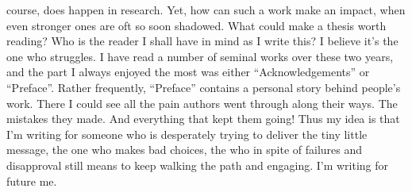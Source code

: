 course, does happen in research. Yet, how can such a work make an impact, when
even stronger ones are oft so soon shadowed.
What could make a thesis worth reading? Who is the reader I shall have in mind
as I write this? I believe it's the one who struggles. I have read a number of
seminal works over these two years, and the part I always enjoyed the most was
either ``Acknowledgements'' or ``Preface''.  Rather frequently, ``Preface''
contains a personal story behind people's work.  There I could see all the pain
authors went through along their ways. The mistakes they made. And everything
that kept them going!  Thus my idea is that I'm writing for someone who is
desperately trying to deliver the tiny little message, the one who makes bad
choices, the who in spite of failures and disapproval still means to keep
walking the path and engaging. I'm writing for future me.

